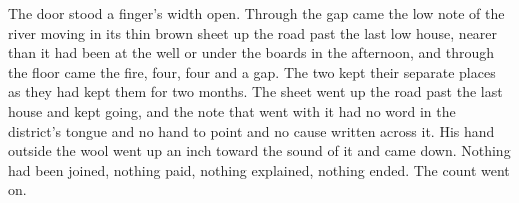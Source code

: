 The door stood a finger's width open. Through the gap came the low note of the river moving in its thin brown sheet up the road past the last low house, nearer than it had been at the well or under the boards in the afternoon, and through the floor came the fire, four, four and a gap. The two kept their separate places as they had kept them for two months. The sheet went up the road past the last house and kept going, and the note that went with it had no word in the district's tongue and no hand to point and no cause written across it. His hand outside the wool went up an inch toward the sound of it and came down. Nothing had been joined, nothing paid, nothing explained, nothing ended. The count went on.
